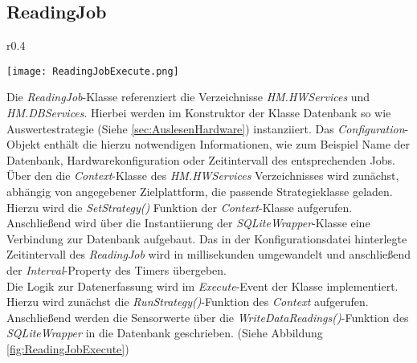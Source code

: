 \subsection{ReadingJob}
\begin{wrapfigure}{r}{0.4\textwidth}
    \vspace{-2cm}
    \begin{center}
      \texttt{[image: ReadingJobExecute.png]}
    \end{center}
    \vspace{-0.5cm}
    \caption{Ablaufdiagram des Execute Events der \textit{ReadingJob}-Klasse}
    \label{fig:ReadingJobExecute}
    \vspace{-1cm}
  \end{wrapfigure}
Die \textit{ReadingJob}-Klasse referenziert die Verzeichnisse \textit{HM.HWServices} und \textit{HM.DBServices}. Hierbei werden im Konstruktor der Klasse Datenbank so wie Auswertestrategie (Siehe \ref{sec:AuslesenHardware}) instanziiert. Das \textit{Configuration}-Objekt enthält die hierzu notwendigen Informationen, wie zum Beispiel Name der Datenbank, Hardwarekonfiguration oder Zeitintervall des entsprechenden Jobs.\\
Über den die \textit{Context}-Klasse des \textit{HM.HWServices} Verzeichnisses wird zunächst, abhängig von angegebener Zielplattform, die passende Strategieklasse geladen. Hierzu wird die \textit{SetStrategy()} Funktion der \textit{Context}-Klasse aufgerufen. Anschließend wird über die Instantiierung der \textit{SQLiteWrapper}-Klasse eine Verbindung zur Datenbank aufgebaut. Das in der Konfigurationsdatei hinterlegte Zeitintervall des \textit{ReadingJob} wird in millisekunden umgewandelt und anschließend der \textit{Interval}-Property des Timers übergeben.\\
Die Logik zur Datenerfassung wird im \textit{Execute}-Event der Klasse implementiert. Hierzu wird zunächst die \textit{RunStrategy()}-Funktion des \textit{Context} aufgerufen. Anschließend werden die Sensorwerte über die \textit{WriteDataReadings()}-Funktion des \textit{SQLiteWrapper} in die Datenbank geschrieben. (Siehe Abbildung \ref{fig:ReadingJobExecute})

